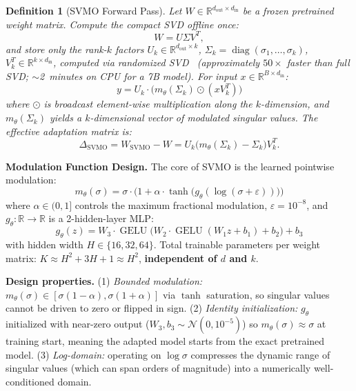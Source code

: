 \documentclass{scpe}
\newtheorem{definition}[theorem]{Definition}
\newcommand{\svmo}{\textsc{SVMO}}
\newcommand{\RR}{\mathbb{R}}
\newcommand{\diag}{\operatorname{diag}}
\newcommand{\GELU}{\operatorname{GELU}}
\begin{document}
\begin{definition}[\svmo{} Forward Pass]
Let $W \in \RR^{d_{\text{out}} \times d_{\text{in}}}$ be a frozen pretrained weight matrix. Compute the compact SVD offline \textit{once}:
\begin{equation}
W = U\Sigma V^T,
\end{equation}
and store only the rank-$k$ factors $U_k \in \RR^{d_{\text{out}} \times k}$, $\Sigma_k = \diag(\sigma_1,\dots,\sigma_k)$, $V_k^T \in \RR^{k \times d_{\text{in}}}$, computed via randomized SVD~\cite{halko2011randomized} (approximately $50\times$ faster than full SVD; $\sim$2~minutes on CPU for a 7B model). For input $x \in \RR^{B \times d_{\text{in}}}$:
\begin{equation}
y = U_k \cdot \big(m_\theta(\Sigma_k) \odot (x V_k^T)\big)
\end{equation}
where $\odot$ is broadcast element-wise multiplication along the $k$-dimension, and $m_\theta(\Sigma_k)$ yields a $k$-dimensional vector of modulated singular values. The effective adaptation matrix is:
\begin{equation}
\Delta_{\text{SVMO}} = W_{\text{SVMO}} - W = U_k\big(m_\theta(\Sigma_k) - \Sigma_k\big)V_k^T.
\end{equation}
\end{definition}

\textbf{Modulation Function Design.} The core of \svmo{} is the learned pointwise modulation:
\begin{equation}
m_\theta(\sigma) = \sigma \cdot \big(1 + \alpha \cdot \tanh\!\big(g_\theta(\log(\sigma + \varepsilon))\big)\big)
\end{equation}
where $\alpha \in (0,1]$ controls the maximum fractional modulation, $\varepsilon = 10^{-8}$, and $g_\theta: \RR \to \RR$ is a 2-hidden-layer MLP:
\begin{equation}
g_\theta(z) = W_3 \cdot \GELU\big(W_2 \cdot \GELU(W_1 z + b_1) + b_2\big) + b_3
\end{equation}
with hidden width $H \in \{16, 32, 64\}$. Total trainable parameters per weight matrix: $K \approx H^2 + 3H + 1 \approx H^2$, \textbf{independent of $d$ and $k$}.

\textbf{Design properties.} (1) \textit{Bounded modulation:} $m_\theta(\sigma) \in [\sigma(1-\alpha), \sigma(1+\alpha)]$ via $\tanh$ saturation, so singular values cannot be driven to zero or flipped in sign. (2) \textit{Identity initialization:} $g_\theta$ initialized with near-zero output ($W_3, b_3 \sim \mathcal{N}(0, 10^{-5})$) so $m_\theta(\sigma) \approx \sigma$ at training start, meaning the adapted model starts from the exact pretrained model. (3) \textit{Log-domain:} operating on $\log\sigma$ compresses the dynamic range of singular values (which can span orders of magnitude) into a numerically well-conditioned domain.
\end{document}
